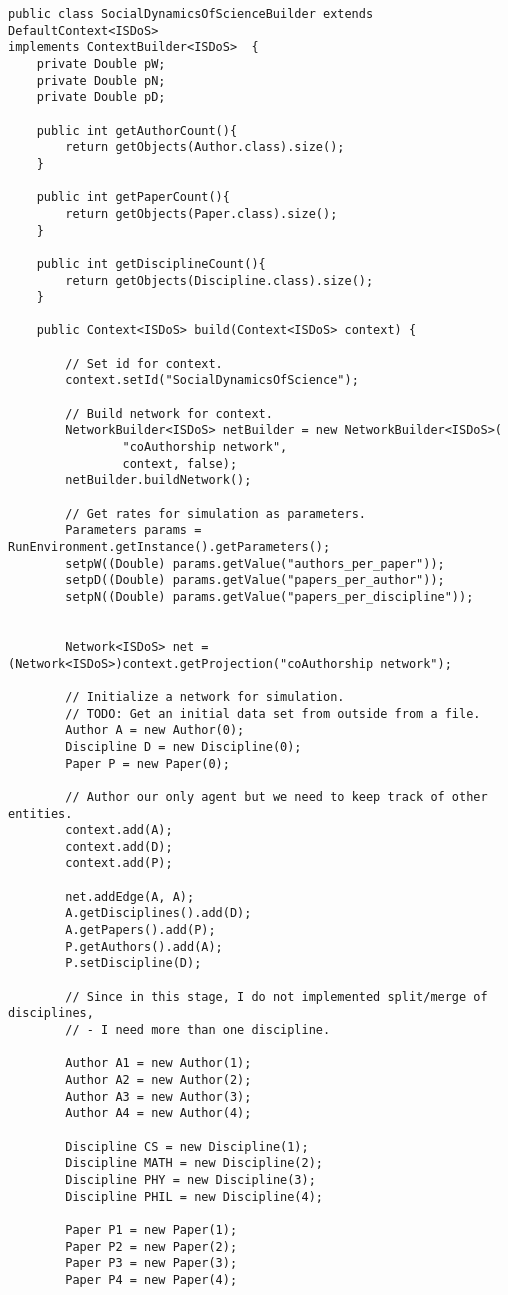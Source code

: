 \begin{lstlisting}
public class SocialDynamicsOfScienceBuilder extends DefaultContext<ISDoS>
implements ContextBuilder<ISDoS>  {
	private Double pW;
	private Double pN;
	private Double pD;

	public int getAuthorCount(){
		return getObjects(Author.class).size();
	}

	public int getPaperCount(){
		return getObjects(Paper.class).size();
	}

	public int getDisciplineCount(){
		return getObjects(Discipline.class).size(); 
	}

	public Context<ISDoS> build(Context<ISDoS> context) {

		// Set id for context.
		context.setId("SocialDynamicsOfScience");

		// Build network for context.
		NetworkBuilder<ISDoS> netBuilder = new NetworkBuilder<ISDoS>(
				"coAuthorship network",
				context, false);
		netBuilder.buildNetwork();

		// Get rates for simulation as parameters.
		Parameters params = RunEnvironment.getInstance().getParameters();
		setpW((Double) params.getValue("authors_per_paper"));
		setpD((Double) params.getValue("papers_per_author"));
		setpN((Double) params.getValue("papers_per_discipline"));


		Network<ISDoS> net = (Network<ISDoS>)context.getProjection("coAuthorship network");

		// Initialize a network for simulation.
		// TODO: Get an initial data set from outside from a file.
		Author A = new Author(0);
		Discipline D = new Discipline(0);
		Paper P = new Paper(0);

		// Author our only agent but we need to keep track of other entities.
		context.add(A);
		context.add(D);
		context.add(P);

		net.addEdge(A, A);
		A.getDisciplines().add(D);
		A.getPapers().add(P);
		P.getAuthors().add(A);
		P.setDiscipline(D);

		// Since in this stage, I do not implemented split/merge of disciplines,
		// - I need more than one discipline.

		Author A1 = new Author(1);
		Author A2 = new Author(2);
		Author A3 = new Author(3);
		Author A4 = new Author(4);

		Discipline CS = new Discipline(1);
		Discipline MATH = new Discipline(2);
		Discipline PHY = new Discipline(3);
		Discipline PHIL = new Discipline(4);

		Paper P1 = new Paper(1);
		Paper P2 = new Paper(2);
		Paper P3 = new Paper(3);
		Paper P4 = new Paper(4);


\end{lstlisting}
